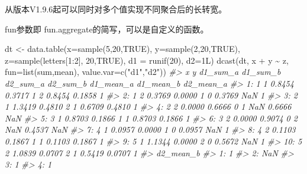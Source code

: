 \documentclass[
]{book}
\newenvironment{Shaded}{\begin{snugshade}}{\end{snugshade}}
\newcommand{\AttributeTok}[1]{\textcolor[rgb]{0.77,0.63,0.00}{#1}}
\newcommand{\CommentTok}[1]{\textcolor[rgb]{0.56,0.35,0.01}{\textit{#1}}}
\newcommand{\ConstantTok}[1]{\textcolor[rgb]{0.00,0.00,0.00}{#1}}
\newcommand{\DecValTok}[1]{\textcolor[rgb]{0.00,0.00,0.81}{#1}}
\newcommand{\FunctionTok}[1]{\textcolor[rgb]{0.00,0.00,0.00}{#1}}
\newcommand{\NormalTok}[1]{#1}
\newcommand{\OtherTok}[1]{\textcolor[rgb]{0.56,0.35,0.01}{#1}}
\newcommand{\SpecialCharTok}[1]{\textcolor[rgb]{0.00,0.00,0.00}{#1}}
\newcommand{\StringTok}[1]{\textcolor[rgb]{0.31,0.60,0.02}{#1}}
\begin{document}
从版本V1.9.6起可以同时对多个值实现不同聚合后的长转宽。

fun参数即 fun.aggregate的简写，可以是自定义的函数。

\begin{Shaded}
\begin{Highlighting}[]
\NormalTok{dt }\OtherTok{\textless{}{-}}  \FunctionTok{data.table}\NormalTok{(}\AttributeTok{x=}\FunctionTok{sample}\NormalTok{(}\DecValTok{5}\NormalTok{,}\DecValTok{20}\NormalTok{,}\ConstantTok{TRUE}\NormalTok{), }\AttributeTok{y=}\FunctionTok{sample}\NormalTok{(}\DecValTok{2}\NormalTok{,}\DecValTok{20}\NormalTok{,}\ConstantTok{TRUE}\NormalTok{),}
                \AttributeTok{z=}\FunctionTok{sample}\NormalTok{(letters[}\DecValTok{1}\SpecialCharTok{:}\DecValTok{2}\NormalTok{], }\DecValTok{20}\NormalTok{,}\ConstantTok{TRUE}\NormalTok{), }\AttributeTok{d1 =} \FunctionTok{runif}\NormalTok{(}\DecValTok{20}\NormalTok{), }\AttributeTok{d2=}\NormalTok{1L)}
\FunctionTok{dcast}\NormalTok{(dt, x }\SpecialCharTok{+}\NormalTok{ y }\SpecialCharTok{\textasciitilde{}}\NormalTok{ z, }\AttributeTok{fun=}\FunctionTok{list}\NormalTok{(sum,mean), }\AttributeTok{value.var=}\FunctionTok{c}\NormalTok{(}\StringTok{"d1"}\NormalTok{,}\StringTok{"d2"}\NormalTok{))}
\CommentTok{\#\textgreater{}     x y d1\_sum\_a d1\_sum\_b d2\_sum\_a d2\_sum\_b d1\_mean\_a d1\_mean\_b d2\_mean\_a}
\CommentTok{\#\textgreater{}  1: 1 1   0.8454   0.3717        1        2    0.8454    0.1858         1}
\CommentTok{\#\textgreater{}  2: 1 2   0.3769   0.0000        1        0    0.3769       NaN         1}
\CommentTok{\#\textgreater{}  3: 2 1   1.3419   0.4810        2        1    0.6709    0.4810         1}
\CommentTok{\#\textgreater{}  4: 2 2   0.0000   0.6666        0        1       NaN    0.6666       NaN}
\CommentTok{\#\textgreater{}  5: 3 1   0.8703   0.1866        1        1    0.8703    0.1866         1}
\CommentTok{\#\textgreater{}  6: 3 2   0.0000   0.9074        0        2       NaN    0.4537       NaN}
\CommentTok{\#\textgreater{}  7: 4 1   0.0957   0.0000        1        0    0.0957       NaN         1}
\CommentTok{\#\textgreater{}  8: 4 2   0.1103   0.1867        1        1    0.1103    0.1867         1}
\CommentTok{\#\textgreater{}  9: 5 1   1.1344   0.0000        2        0    0.5672       NaN         1}
\CommentTok{\#\textgreater{} 10: 5 2   1.0839   0.0707        2        1    0.5419    0.0707         1}
\CommentTok{\#\textgreater{}     d2\_mean\_b}
\CommentTok{\#\textgreater{}  1:         1}
\CommentTok{\#\textgreater{}  2:       NaN}
\CommentTok{\#\textgreater{}  3:         1}
\CommentTok{\#\textgreater{}  4:         1}

\end{Highlighting}
\end{Shaded}
\end{document}
